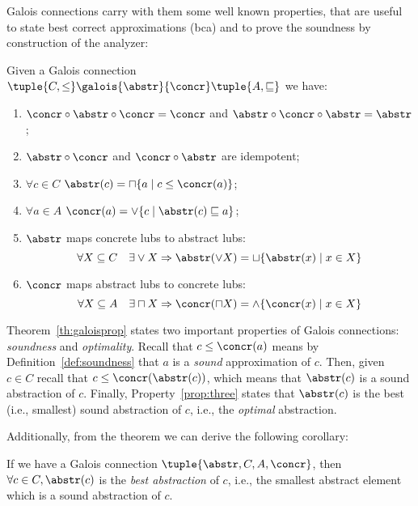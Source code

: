 Galois connections carry with them some well known properties, that
are useful to state best correct approximations (bca) and to prove the
soundness by construction of the analyzer:

\begin{theorem}\label{th:galoisprop}
  Given a Galois connection
  \(\tuple{C,\leq} \galois{\abstr}{\concr} \tuple{A, \sqsubseteq}\) we
  have:
  \begin{enumerate}
  \item \(\concr \circ \abstr \circ \concr = \concr\) and
    \(\abstr \circ \concr \circ \abstr = \abstr\);
  \item \(\abstr \circ \concr\) and \(\concr \circ \abstr\) are
    idempotent;
  \item\label{prop:three} \(\forall c \in C\)
    \(\abstr(c) = \sqcap \{a \mid c \leq \concr(a)\}\);
  \item \(\forall a \in A\)
    \(\concr(a) = \vee \{ c \mid \abstr(c) \sqsubseteq a \}\);
  \item\label{prop:five} \(\abstr\) maps concrete lubs to abstract lubs:
    \begin{equation*}
      \forall X \subseteq C \quad \exists \vee X \Rightarrow \abstr(\vee X) = \sqcup \{\abstr(x) \mid x \in X\}
    \end{equation*}
  \item \(\concr\) maps abstract lubs to concrete lubs:
    \begin{equation*}
      \forall X \subseteq A \quad \exists \sqcap X \Rightarrow \concr(\sqcap X) = \wedge \{\concr(x) \mid x \in X\}
    \end{equation*}
  \end{enumerate}
\end{theorem}

Theorem~\ref{th:galoisprop} states two important properties of Galois
connections: \emph{soundness} and \emph{optimality}. Recall that
\(c \leq \concr(a)\) means by Definition~\ref{def:soundness} that
\(a\) is a \emph{sound} approximation of \(c\). Then, given
\(c \in C\) recall that \(c \leq \concr(\abstr(c))\), which means that
\(\abstr(c)\) is a sound abstraction of \(c\). Finally,
Property~\ref{prop:three} states that \(\abstr(c)\) is the best (i.e.,
smallest) sound abstraction of \(c\), i.e., the \emph{optimal}
abstraction.

Additionally, from the theorem we can derive the
following corollary:

\begin{corollary}\label{co:bestabstr}
  If we have a Galois connection \(\tuple{\abstr, C, A, \concr}\),
  then \(\forall c \in C, \abstr(c)\) is the \emph{best abstraction}
  of \(c\), i.e., the smallest abstract element which is a sound
  abstraction of \(c\).
\end{corollary}

